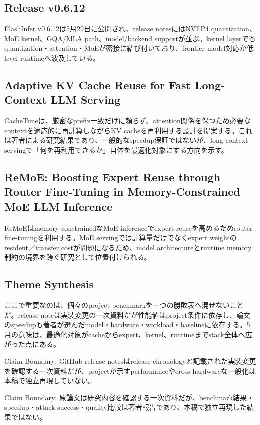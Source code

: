 \subsection{Release v0.6.12}

FlashInfer v0.6.12は5月29日に公開され、release notesにはNVFP4 quantization、MoE kernel、GQA/MLA path、model/backend supportが並ぶ。kernel layerでもquantization・attention・MoEが密接に結び付いており、frontier model対応が低level runtimeへ波及している。\autocite{src-74a7052acd7a}


\subsection{Adaptive KV Cache Reuse for Fast Long-Context LLM Serving}

CacheTuneは、厳密なprefix一致だけに頼らず、attention関係を保つため必要なcontextを適応的に再計算しながらKV cacheを再利用する設計を提案する。これは著者による研究結果であり、一般的なspeedup保証ではないが、long-context servingで「何を再利用できるか」自体を最適化対象にする方向を示す。\autocite{src-3707e05fd2a3}


\subsection{ReMoE: Boosting Expert Reuse through Router Fine-Tuning in Memory-Constrained MoE LLM Inference}

ReMoEはmemory-constrainedなMoE inferenceでexpert reuseを高めるためrouter fine-tuningを利用する。MoE servingでは計算量だけでなくexpert weightのresident／transfer costが問題になるため、model architectureとruntime memory制約の境界を跨ぐ研究として位置付けられる。\autocite{src-ba75040df3fc}


\subsection{Theme Synthesis}

ここで重要なのは、個々のproject benchmarkを一つの勝敗表へ混ぜないことだ。release noteは実装変更の一次資料だが性能値はproject条件に依存し、論文のspeedupも著者が選んだmodel・hardware・workload・baselineに依存する。5月の意味は、最適化対象がcacheからexpert、kernel、runtimeまでstack全体へ広がった点にある。\autocite{src-3707e05fd2a3,src-5a693cfc6852,src-69c5523286bd,src-74a7052acd7a,src-77e29e3fac8f,src-80b8d67933c0,src-ba75040df3fc,src-c97320147e8c}


\begin{claimboundary}
Claim Boundary: GitHub release notesはrelease chronologyと記載された実装変更を確認する一次資料だが、projectが示すperformanceやcross-hardwareな一般化は本稿で独立再現していない。\autocite{src-3707e05fd2a3,src-5a693cfc6852,src-69c5523286bd,src-74a7052acd7a,src-77e29e3fac8f,src-80b8d67933c0,src-ba75040df3fc,src-c97320147e8c}
\end{claimboundary}

\begin{claimboundary}
Claim Boundary: 原論文は研究内容を確認する一次資料だが、benchmark結果・speedup・attack success・quality比較は著者報告であり、本稿で独立再現した結果ではない。\autocite{src-3707e05fd2a3,src-5a693cfc6852,src-69c5523286bd,src-74a7052acd7a,src-77e29e3fac8f,src-80b8d67933c0,src-ba75040df3fc,src-c97320147e8c}
\end{claimboundary}
